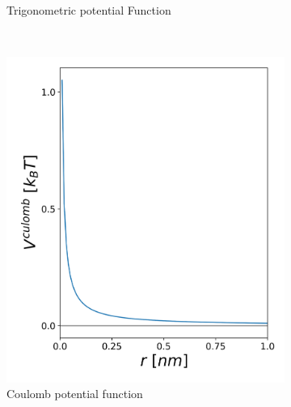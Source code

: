 \begin{figure}[h!]
\begin{subfigure}{0.45\textwidth}
        \caption{Trigonometric potential Function}
	\label{sfig: tf}
    \end{subfigure}
    \\
        \begin{subfigure}{0.45\textwidth}
        \includegraphics[width=\textwidth]{2_chapter_intro/fig/ForceField/coulombV.png}
        \caption{Coulomb potential function}
	\label{sfig: cf}
    \end{subfigure}
        \begin{subfigure}{0.45\textwidth}

\end{subfigure}
\end{figure}
